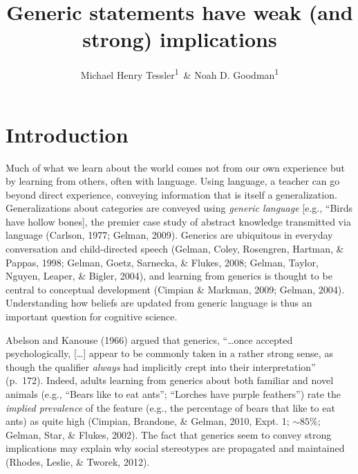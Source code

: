 \documentclass[,man,floatsintext]{apa6}
\title{Generic statements have weak (and strong) implications}
\author{Michael Henry Tessler\textsuperscript{1}~\& Noah D.
Goodman\textsuperscript{1}}
\date{}
\affiliation{
\vspace{0.5cm}
\textsuperscript{1} Department of Psychology, Stanford University}
\theoremstyle{definition}
\theoremstyle{definition}
\theoremstyle{definition}
\theoremstyle{remark}
\begin{document}
\maketitle

\newcommand{\denote}[1]{\mbox{ $[\![ #1 ]\!]$}}
\newcommand*\diff{\mathop{}\!\mathrm{d}}

 

\newcommand{\mht}[1]{{\textcolor{Blue}{[mht: #1]}}}
\newcommand{\ndg}[1]{{\textcolor{Green}{[ndg: #1]}}}
\newcommand{\red}[1]{{\textcolor{Red}{#1}}}







\section{Introduction}\label{introduction}

Much of what we learn about the world comes not from our own experience
but by learning from others, often with language. Using language, a
teacher can go beyond direct experience, conveying information that is
itself a generalization. Generalizations about categories are conveyed
using \emph{generic language} {[}e.g., ``Birds have hollow bones{]}, the
premier case study of abstract knowledge transmitted via language
(Carlson, 1977; Gelman, 2009). Generics are ubiquitous in everyday
conversation and child-directed speech (Gelman, Coley, Rosengren,
Hartman, \& Pappas, 1998; Gelman, Goetz, Sarnecka, \& Flukes, 2008;
Gelman, Taylor, Nguyen, Leaper, \& Bigler, 2004), and learning from
generics is thought to be central to conceptual development (Cimpian \&
Markman, 2009; Gelman, 2004). Understanding how beliefs are updated from
generic language is thus an important question for cognitive science.

Abelson and Kanouse (1966) argued that generics, \enquote{\ldots{}once
accepted psychologically, {[}\ldots{}{]} appear to be commonly taken in
a rather strong sense, as though the qualifier \emph{always} had
implicitly crept into their interpretation} (p.~172). Indeed, adults
learning from generics about both familiar and novel animals (e.g.,
\enquote{Bears like to eat ants}; \enquote{Lorches have purple
feathers}) rate the \emph{implied prevalence} of the feature (e.g., the
percentage of bears that like to eat ants) as quite high (Cimpian,
Brandone, \& Gelman, 2010, Expt. 1; \(\sim 85\%\); Gelman, Star, \&
Flukes, 2002). The fact that generics seem to convey strong implications
may explain why social stereotypes are propagated and maintained
(Rhodes, Leslie, \& Tworek, 2012).
\end{document}
